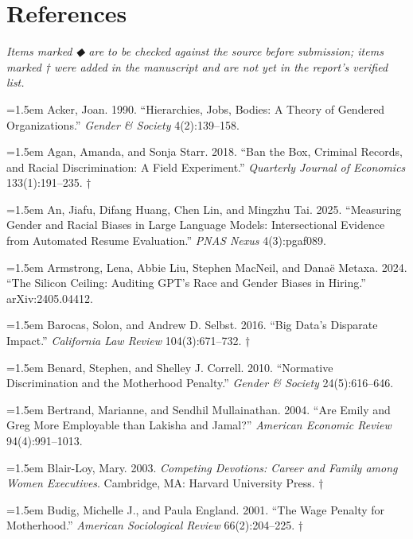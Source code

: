 \documentclass[11pt]{article}
\begin{document}
\section*{References}
{\small{}
\noindent\textit{Items marked ◆ are to be checked against the source before submission;
items marked † were added in the manuscript and are not yet in the
report's verified list.}\par\medskip
\noindent\hangindent=1.5em Acker, Joan. 1990. ``Hierarchies, Jobs, Bodies: A Theory of Gendered
Organizations.'' \emph{Gender \& Society} 4(2):139--158.\par\smallskip
\noindent\hangindent=1.5em Agan, Amanda, and Sonja Starr. 2018. ``Ban the Box, Criminal Records,
and Racial Discrimination: A Field Experiment.'' \emph{Quarterly Journal
of Economics} 133(1):191--235. †\par\smallskip
\noindent\hangindent=1.5em An, Jiafu, Difang Huang, Chen Lin, and Mingzhu Tai. 2025. ``Measuring
Gender and Racial Biases in Large Language Models: Intersectional
Evidence from Automated Resume Evaluation.'' \emph{PNAS Nexus}
4(3):pgaf089.\par\smallskip
\noindent\hangindent=1.5em Armstrong, Lena, Abbie Liu, Stephen MacNeil, and Danaë Metaxa. 2024.
``The Silicon Ceiling: Auditing GPT's Race and Gender Biases in
Hiring.'' arXiv:2405.04412.\par\smallskip
\noindent\hangindent=1.5em Barocas, Solon, and Andrew D. Selbst. 2016. ``Big Data's Disparate
Impact.'' \emph{California Law Review} 104(3):671--732. †\par\smallskip
\noindent\hangindent=1.5em Benard, Stephen, and Shelley J. Correll. 2010. ``Normative
Discrimination and the Motherhood Penalty.'' \emph{Gender \& Society}
24(5):616--646.\par\smallskip
\noindent\hangindent=1.5em Bertrand, Marianne, and Sendhil Mullainathan. 2004. ``Are Emily and Greg
More Employable than Lakisha and Jamal?'' \emph{American Economic
Review} 94(4):991--1013.\par\smallskip
\noindent\hangindent=1.5em Blair-Loy, Mary. 2003. \emph{Competing Devotions: Career and Family
among Women Executives}. Cambridge, MA: Harvard University Press. †\par\smallskip
\noindent\hangindent=1.5em Budig, Michelle J., and Paula England. 2001. ``The Wage Penalty for
Motherhood.'' \emph{American Sociological Review} 66(2):204--225. †\par\smallskip
}
\end{document}
